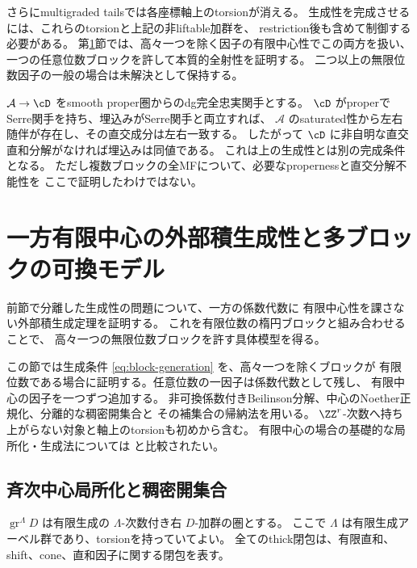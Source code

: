 さらにmultigraded tailsでは各座標軸上のtorsionが消える。
生成性を完成させるには、これらのtorsionと上記の非liftable加群を、
restriction後も含めて制御する必要がある。
第\ref{sec:finite-center}節では、高々一つを除く因子の有限中心性でこの両方を扱い、
一つの任意位数ブロックを許して本質的全射性を証明する。
二つ以上の無限位数因子の一般の場合は未解決として保持する。

\begin{remark}[別の十分条件]
 \(\mathcal A\to\cD\) をsmooth proper圏からのdg完全忠実関手とする。
 \(\cD\) がproperでSerre関手を持ち、埋込みがSerre関手と両立すれば、
 \(\mathcal A\) のsaturated性から左右随伴が存在し、その直交成分は左右一致する。
 したがって \(\cD\) に非自明な直交直和分解がなければ埋込みは同値である。
 これは上の生成性とは別の完成条件となる。
 ただし複数ブロックの全MFについて、必要なpropernessと直交分解不能性を
 ここで証明したわけではない。
\end{remark}

\section{一方有限中心の外部積生成性と多ブロックの可換モデル}\label{sec:finite-center}

前節で分離した生成性の問題について、一方の係数代数に
有限中心性を課さない外部積生成定理を証明する。
これを有限位数の楕円ブロックと組み合わせることで、
高々一つの無限位数ブロックを許す具体模型を得る。

この節では生成条件 \eqref{eq:block-generation} を、高々一つを除くブロックが
有限位数である場合に証明する。任意位数の一因子は係数代数として残し、
有限中心の因子を一つずつ追加する。
非可換係数付きBeilinson分解、中心のNoether正規化、分離的な稠密開集合と
その補集合の帰納法を用いる。
\(\ZZ^r\)-次数へ持ち上がらない対象と軸上のtorsionも初めから含む。
有限中心の場合の基礎的な局所化・生成法については \cite{ELS} と比較されたい。

\subsection{斉次中心局所化と稠密開集合}

\(\operatorname{gr}^{\Lambda}D\) は有限生成の \(\Lambda\)-次数付き右 \(D\)-加群の圏とする。
ここで \(\Lambda\) は有限生成アーベル群であり、torsionを持っていてよい。
全てのthick閉包は、有限直和、shift、cone、直和因子に関する閉包を表す。

